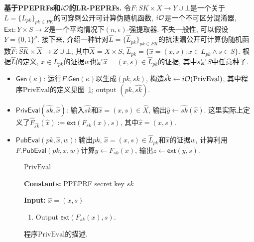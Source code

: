 \medskip\noindent\textbf{基于PPEPRFs和$i\mathcal{O}$的LR-PEPRFs.} 令$F: SK \times X \rightarrow Y \cup \bot$是一个关于$L = \{L_{pk}\}_{pk \in PK}$的可穿刺公开可计算伪随机函数, $i\mathcal{O}$是一个不可区分混淆器, $\mathsf{Ext}: Y \times S \rightarrow Z$是一个平均情况下$(n, \epsilon)$-强提取器. 不失一般性, 可以假设$Y = \{0,1\}^{\rho}$. 接下来, 介绍一种针对$\hat{L} = \{\hat{L}_{pk}\}_{pk \in PK}$的抗泄漏公开可计算伪随机函数$\hat{F}: \hat{SK} \times \hat{X} \rightarrow Z \cup \bot$, 
其中$\hat{X} = X \times S$, $\hat{L}_{pk} = \{\hat{x} = (x, s): x \in L_{pk} \wedge s \in S\}$. 
根据$\hat{L}$的定义, $x \in L_{pk}$的证据$w$也是$\hat{x} = (x, s) \in \hat{L}_{pk}$的证据, 其中$s$是$S$中任意种子.   

\begin{itemize}\itemsep 1pt \parskip 0pt \parsep 0pt
\item $\mathsf{Gen}(\kappa)$: 运行$F.\mathsf{Gen}(\kappa)$以生成$(pk, sk)$, 构造$\hat{sk} \leftarrow i\mathcal{O}(\text{PrivEval})$, 其中程序$\text{PrivEval}$的定义见图~\ref{fig:ch5-PPEPRF-PrivEval}; 
    output $(pk, \hat{sk})$.  

\item $\mathsf{PrivEval}(\hat{sk}, \hat{x})$: 输入$\hat{sk}$和$\hat{x} = (x, s) \in \hat{X}$, 
输出$\hat{y} \leftarrow \hat{sk}(\hat{x})$. 这里实际上定义了$\hat{F}_{\hat{sk}}(\hat{x}) := \mathsf{ext}(F_{sk}(x), s)$, 其中$\hat{x} = (x, s)$.     

\item $\mathsf{PubEval}(pk, \hat{x}, w)$: 输出$pk$, $\hat{x} = (x, s) \in \hat{L}_{pk}$和$\hat{x}$的证据$w$, 计算利用$F.\mathsf{PubEval}(pk, x, w)$计算$y \leftarrow F_{sk}(x)$, 输出$z \leftarrow \mathsf{ext}(y, s)$. 
\end{itemize}

\begin{figure}[!hbth]
\begin{framed}
\begin{minipage}[center]{\textwidth}
\begin{center}
    $\text{PrivEval}$ 
\end{center}
\vspace{-1em}
\begin{trivlist}
    \item \textbf{Constants:} PPEPRF secret key $sk$
    
    \item \textbf{Input:} $\hat{x} = (x, s)$ 
        \begin{enumerate}\itemsep 1pt \parskip 0pt \parsep 0pt
            \item Output $\mathsf{ext}(F_{sk}(x), s)$. 
        \end{enumerate}
\end{trivlist}
\end{minipage}
\end{framed}
\caption{程序$\text{PrivEval}$的描述.}
\label{fig:ch5-PPEPRF-PrivEval}
\end{figure} 

